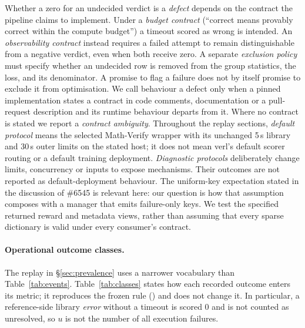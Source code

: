\documentclass[10pt,a4paper]{article}
\let\cite\citep
\begin{document}
Whether a zero for an undecided verdict is a \emph{defect} depends on the
contract the pipeline claims to implement. Under a \emph{budget contract}
(``correct means provably correct within the compute budget'') a timeout
scored as wrong is intended. An \emph{observability contract} instead
requires a failed attempt to remain distinguishable from a negative verdict,
even when both receive zero. A separate \emph{exclusion policy} must specify
whether an undecided row is removed from the group statistics, the loss,
and its denominator. A promise to flag a failure does not by itself promise
to exclude it from optimisation. We call
behaviour a defect only when a pinned implementation states a contract in
code comments, documentation or a pull-request description and its runtime
behaviour departs from it. Where no contract is stated we report a
\emph{contract ambiguity}. Throughout the replay sections, \emph{default protocol} means the
selected Math-Verify wrapper with its unchanged 5\,s library and 30\,s outer
limits on the stated host; it does not mean verl's default scorer routing
or a default training deployment. \emph{Diagnostic protocols} deliberately
change limits, concurrency or inputs to expose mechanisms. Their outcomes
are not reported as default-deployment behaviour.
The uniform-key expectation stated in the discussion of \#6545
\cite{verl6545} is relevant here: our question is how that assumption
composes with a manager that emits failure-only keys. We test the
specified returned reward and metadata views, rather than assuming that
every sparse dictionary is valid under every consumer's contract.

\paragraph{Operational outcome classes.}
The replay in \S\ref{sec:prevalence} uses a narrower vocabulary than
Table~\ref{tab:events}. Table~\ref{tab:classes} states how each recorded
outcome enters its metric; it reproduces the frozen rule
() and does not change it. In particular, a
reference-side library \emph{error} without a timeout is scored $0$ and is
not counted as unresolved, so $u$ is not the number of all execution
failures.
\end{document}
